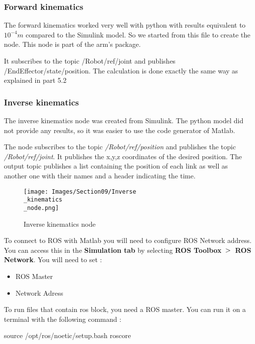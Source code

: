 \subsubsection{Forward kinematics}

The forward kinematics worked very well with python with results equivalent to $10^{-4}m$ compared to the Simulink model. So we started from this file to create the node. This node is part of the arm's package. 

\bigbreak
It subscribes to the topic /Robot/ref/joint and publishes /EndEffector/state/position. The calculation is done exactly the same way as explained in part 5.2

\subsubsection{Inverse kinematics}

The inverse kinematics node was created from Simulink. The python model did not provide any results, so it was easier to use the code generator of Matlab.

\bigbreak
The node subscribes to the topic \textit{/Robot/ref/position} and publishes the topic \textit{/Robot/ref/joint}. It publishes the x,y,z coordinates of the desired position. The output topic publishes a list containing the position of each link as well as another one with their names and a header indicating the time.
\bigbreak
\begin{figure}[ht]
    \centering
    \texttt{[image: Images/Section09/Inverse\\\_kinematics\\\_node.png]}
    \caption{Inverse kinematics node}
    \label{fig:InverseKinNode}
\end{figure}
\FloatBarrier

\bigbreak
To connect to ROS with Matlab you will need to configure ROS Network address. You can access this in the \textbf{Simulation tab} by selecting \textbf{ROS Toolbox} $\bg$ \textbf{ROS Network}. You will need to set :
\begin{multicols}{2}
    \begin{itemize}[noitemsep]
        \item ROS Master
        \item Network Adress
    \end{itemize}
\end{multicols}

\bigbreak
To run files that contain ros block, you need a ROS master. You can run it on a terminal with the following command :
\begin{commandshell}
    source /opt/ros/noetic/setup.bash
    roscore
\end{commandshell} 

